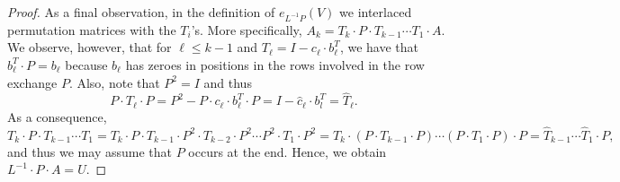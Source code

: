 \begin{proof}
As a final observation, in the definition of $e_{L^{-1}P}(V)$ 
we interlaced permutation matrices with the $T_i$'s. More specifically, 
$A_k=T_k\cdot P\cdot T_{k-1}\cdots T_1\cdot A$. We observe, however, that for $\ell\leq k-1$ and
$T_{\ell}=I-c_\ell\cdot b_\ell^T$, we have that  $b_\ell^T\cdot P=b_\ell$ because $b_\ell$ has zeroes in positions in the rows involved in the row exchange $P$. Also, note that  $P^2=I$ and thus 
$$P\cdot T_\ell\cdot P=P^2-P\cdot c_\ell\cdot b_\ell^T\cdot P=I-\widehat{c}_\ell\cdot b_l^T=\widehat{T}_\ell.$$
%
%
As a consequence,
$$
T_k\cdot P\cdot T_{k-1}\cdots T_1=T_k\cdot P\cdot T_{k-1}\cdot P^2\cdot T_{k-2}\cdot P^2\cdots P^2 \cdot T_1\cdot P^2=T_k\cdot (P\cdot T_{k-1}\cdot P)\cdots (P\cdot T_1\cdot P)\cdot P=\widehat{T}_{k-1}\cdots \widehat{T}_1\cdot P,
$$
and thus we may assume that $P$ occurs at the end. Hence, we obtain $L^{-1}\cdot P\cdot A=U$.
%
%
\end{proof}


